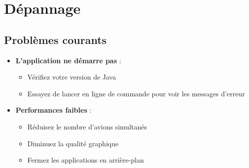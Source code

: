 \documentclass[12pt,a4paper]{article}
\begin{document}
\section{Dépannage}

\subsection{Problèmes courants}
\begin{itemize}
    \item \textbf{L'application ne démarre pas} :
    \begin{itemize}
        \item Vérifiez votre version de Java
        \item Essayez de lancer en ligne de commande pour voir les messages d'erreur
    \end{itemize}
    \item \textbf{Performances faibles} :
    \begin{itemize}
        \item Réduisez le nombre d'avions simultanés
        \item Diminuez la qualité graphique
        \item Fermez les applications en arrière-plan
    \end{itemize}
\end{itemize}
\end{document}
